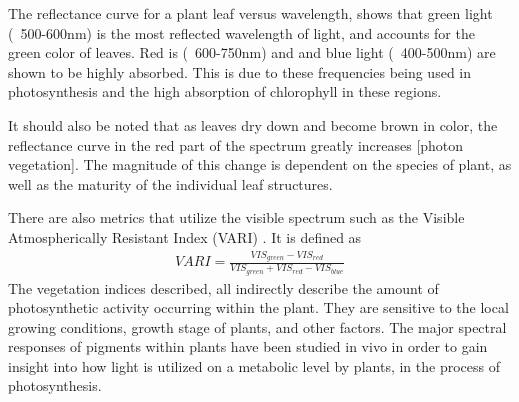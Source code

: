 The reflectance curve for a plant leaf versus wavelength, shows that green light (~500-600nm) is the most reflected wavelength of light, and accounts for the green color of leaves. Red is (~600-750nm) and and blue light (~400-500nm) are shown to be highly absorbed.  This is due to these frequencies being used in photosynthesis and the high absorption of chlorophyll in these regions.

It should also be noted that as leaves dry down and become brown in color, the reflectance curve in the red part of the spectrum greatly increases [photon vegetation].  The magnitude of this change is dependent on the species of plant, as well as the maturity of the individual leaf structures.

There are also metrics that utilize the visible spectrum such as the Visible Atmospherically Resistant Index (VARI) \cite{harris}.  It is defined as
%
\begin{align}
    VARI = \frac{VIS_{green} - VIS_{red}}{VIS_{green} + VIS_{red}-VIS_{blue}}
\end{align}
%
The vegetation indices described, all indirectly describe the amount of photosynthetic activity occurring within the plant.  They are sensitive to the local growing conditions, growth stage of plants, and other factors. The major spectral responses of pigments within plants have been studied in vivo in order to gain insight into how light is utilized on a metabolic level by plants, in the process of photosynthesis.
